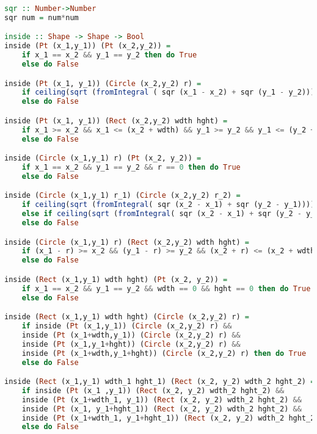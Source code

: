 \begin{lstlisting}[language=haskell]
sqr :: Number->Number
sqr num = num*num

inside :: Shape -> Shape -> Bool
inside (Pt (x_1,y_1)) (Pt (x_2,y_2)) =
    if x_1 == x_2 && y_1 == y_2 then do True
    else do False

inside (Pt (x_1, y_1)) (Circle (x_2,y_2) r) =
    if ceiling(sqrt (fromIntegral ( sqr (x_1 - x_2) + sqr (y_1 - y_2)))) <= r then do True
    else do False

inside (Pt (x_1, y_1)) (Rect (x_2,y_2) wdth hght) =
    if x_1 >= x_2 && x_1 <= (x_2 + wdth) && y_1 >= y_2 && y_1 <= (y_2 + hght)  then do True
    else do False

inside (Circle (x_1,y_1) r) (Pt (x_2, y_2)) =
    if x_1 == x_2 && y_1 == y_2 && r == 0 then do True
    else do False

inside (Circle (x_1,y_1) r_1) (Circle (x_2,y_2) r_2) =
    if ceiling(sqrt (fromIntegral( sqr (x_2 - x_1) + sqr (y_2 - y_1)))) > (r_1 + r_2) then do False
    else if ceiling(sqrt (fromIntegral( sqr (x_2 - x_1) + sqr (y_2 - y_1)))) <= (abs (r_1 - r_2)) then do True
    else do False

inside (Circle (x_1,y_1) r) (Rect (x_2,y_2) wdth hght) =
    if (x_1 - r) >= x_2 && (y_1 - r) >= y_2 && (x_2 + r) <= (x_2 + wdth) && (y_2 + r) <= (y_2 + hght) then do True
    else do False

inside (Rect (x_1,y_1) wdth hght) (Pt (x_2, y_2)) =
    if x_1 == x_2 && y_1 == y_2 && wdth == 0 && hght == 0 then do True
    else do False

inside (Rect (x_1,y_1) wdth hght) (Circle (x_2,y_2) r) =
    if inside (Pt (x_1,y_1)) (Circle (x_2,y_2) r) &&
    inside (Pt (x_1+wdth,y_1)) (Circle (x_2,y_2) r) &&
    inside (Pt (x_1,y_1+hght)) (Circle (x_2,y_2) r) &&
    inside (Pt (x_1+wdth,y_1+hght)) (Circle (x_2,y_2) r) then do True
    else do False

inside (Rect (x_1,y_1) wdth_1 hght_1) (Rect (x_2, y_2) wdth_2 hght_2) =
    if inside (Pt (x_1 ,y_1)) (Rect (x_2, y_2) wdth_2 hght_2) &&
    inside (Pt (x_1+wdth_1, y_1)) (Rect (x_2, y_2) wdth_2 hght_2) &&
    inside (Pt (x_1, y_1+hght_1)) (Rect (x_2, y_2) wdth_2 hght_2) &&
    inside (Pt (x_1+wdth_1, y_1+hght_1)) (Rect (x_2, y_2) wdth_2 hght_2) then do True
    else do False
\end{lstlisting}